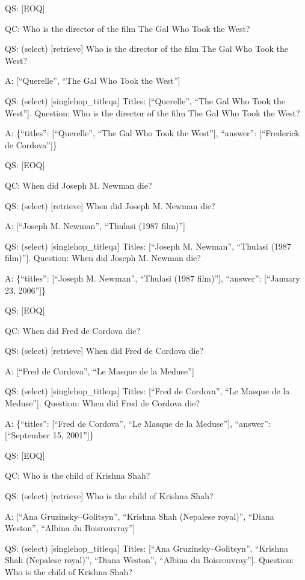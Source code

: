 \documentclass[
]{article}
\begin{document}
QS: {[}EOQ{]}

QC: Who is the director of the film The Gal Who Took the West?

QS: (select) {[}retrieve{]} Who is the director of the film The Gal Who
Took the West?

A: {[}``Querelle'', ``The Gal Who Took the West''{]}

QS: (select) {[}singlehop\_titleqa{]} Titles: {[}``Querelle'', ``The Gal
Who Took the West''{]}. Question: Who is the director of the film The
Gal Who Took the West?

A: \{``titles'': {[}``Querelle'', ``The Gal Who Took the West''{]},
``answer'': {[}``Frederick de Cordova''{]}\}

QS: {[}EOQ{]}

QC: When did Joseph M. Newman die?

QS: (select) {[}retrieve{]} When did Joseph M. Newman die?

A: {[}``Joseph M. Newman'', ``Thulasi (1987 film)''{]}

QS: (select) {[}singlehop\_titleqa{]} Titles: {[}``Joseph M. Newman'',
``Thulasi (1987 film)''{]}. Question: When did Joseph M. Newman die?

A: \{``titles'': {[}``Joseph M. Newman'', ``Thulasi (1987 film)''{]},
``answer'': {[}``January 23, 2006''{]}\}

QS: {[}EOQ{]}

QC: When did Fred de Cordova die?

QS: (select) {[}retrieve{]} When did Fred de Cordova die?

A: {[}``Fred de Cordova'', ``Le Masque de la Meduse''{]}

QS: (select) {[}singlehop\_titleqa{]} Titles: {[}``Fred de Cordova'',
``Le Masque de la Meduse''{]}. Question: When did Fred de Cordova die?

A: \{``titles'': {[}``Fred de Cordova'', ``Le Masque de la Meduse''{]},
``answer'': {[}``September 15, 2001''{]}\}

QS: {[}EOQ{]}

QC: Who is the child of Krishna Shah?

QS: (select) {[}retrieve{]} Who is the child of Krishna Shah?

A: {[}``Ana Gruzinsky--Golitsyn'', ``Krishna Shah (Nepalese royal)'',
``Diana Weston'', ``Albina du Boisrouvray''{]}

QS: (select) {[}singlehop\_titleqa{]} Titles: {[}``Ana
Gruzinsky--Golitsyn'', ``Krishna Shah (Nepalese royal)'', ``Diana
Weston'', ``Albina du Boisrouvray''{]}. Question: Who is the child of
Krishna Shah?
\end{document}
